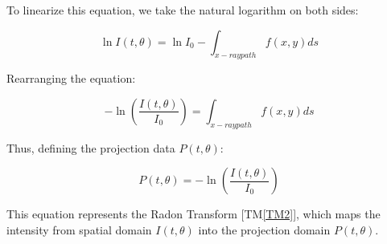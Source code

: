 \documentclass[12pt]{article}
\begin{document}
To linearize this equation, we take the natural logarithm on both sides:

\begin{equation}
    \ln I(t, \theta) = \ln I_0 - \int_{x-ray path} f(x,y) ds
\end{equation}

Rearranging the equation:

\begin{equation}
    -\ln \left( \frac{I(t, \theta)}{I_0} \right) = \int_{x-ray path} f(x,y) ds
\end{equation}

Thus, defining the projection data \( P(t, \theta) \):

\begin{equation}
    P(t,\theta) = -\ln(\frac{I(t,\theta)}{I_0})
\end{equation}

This equation represents the Radon Transform [TM\ref{TM2}], which maps the
intensity from spatial domain $I(t, \theta)$ into the projection domain $P(t, \theta)$.


~\newline
\end{document}
